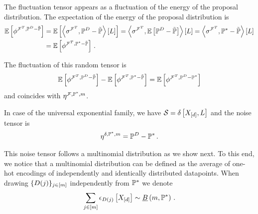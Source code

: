 
The fluctuation tensor appears as a fluctuation of the energy of the proposal distribution.
The expectation of the energy of the proposal distribution is
\begin{align*}
    \mathbb{E}\left[\phi^{\mathcal{F}^T,\mathbb{P}^{D}-\tilde{\mathbb{P}}}\right]
    &= \mathbb{E}\left[\left\langle \sigma^{\mathcal{F}^T},\mathbb{P}^{D}-\tilde{\mathbb{P}}\right\rangle \left[ L \right]\right]
    = \left\langle \sigma^{\mathcal{F}^T},\mathbb{E}\left[\mathbb{P}^{D}-\tilde{\mathbb{P}}\right]\right\rangle \left[ L \right]
    = \left\langle \sigma^{\mathcal{F}^T},\mathbb{P}^*-\tilde{\mathbb{P}}\right\rangle \left[ L \right]\\
    &= \mathbb{E}\left[\phi^{\mathcal{F}^T,\mathbb{P}^*-\tilde{\mathbb{P}}}\right] \, .
\end{align*}

The fluctuation of this random tensor is
\begin{align*}
    \mathbb{E}\left[\phi^{\mathcal{F}^T,\mathbb{P}^{D}-\tilde{\mathbb{P}}}\right]  - \mathbb{E}\left[\phi^{\mathcal{F}^T,\mathbb{P}^*-\tilde{\mathbb{P}}}\right]
    = \mathbb{E}\left[\phi^{\mathcal{F}^T,\mathbb{P}^{D}-\mathbb{P}^*}\right]
\end{align*}
and coincides with $\eta^{\mathcal{F},\mathbb{P}^*,m}$.


In case of the universal exponential family, we have $\mathcal{S}=\delta\left[X_{[d]},L\right]$ and the noise tensor is
\begin{align*}
    \eta^{\delta,\mathbb{P}^*,m} = \mathbb{P}^{D} - \mathbb{P}^* \, .
\end{align*}

This noise tensor follows a multinomial distribution as we show next.
To this end, we notice that a multinomial distribution can be defined as the average of one-hot encodings of independently and identically distributed datapoints.
When drawing $\{D(j)\}_{j\in[m]}$ independently from $\mathbb{P}^*$ we denote
\begin{align*}
    \sum_{j\in[m]}\epsilon_{D(j)}\left[X_{[d]}\right]
    \sim \underline{B}\left(m,\mathbb{P}^*\right) \, .
\end{align*}

